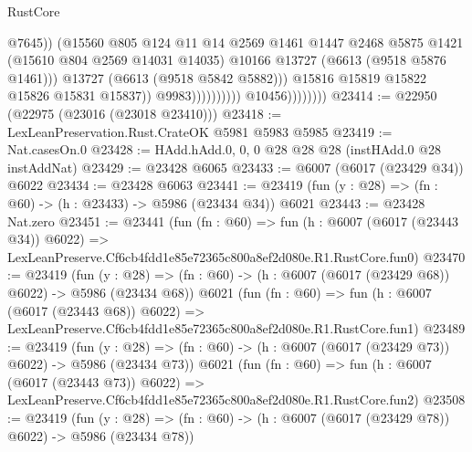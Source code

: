 \begin{lexlean}{RustCore}
\begin{coremodule}
                                                  @7645))
                                              (@15560
                                                @805
                                                @124
                                                @11
                                                @14
                                                @2569
                                                @1461
                                                @1447
                                                @2468
                                                @5875
                                                @1421
                                                (@15610 @804 @2569 @14031 @14035)
                                                @10166
                                                @13727
                                                (@6613 (@9518 @5876 @1461)))
                                              @13727
                                              (@6613 (@9518 @5842 @5882)))
                                            @15816
                                            @15819
                                            @15822
                                            @15826
                                            @15831
                                            @15837))
                                        @9983))))))))))
                    @10456))))))))
@23414 := @22950 (@22975 (@23016 (@23018 @23410)))
@23418 := LexLeanPreservation.Rust.CrateOK @5981 @5983 @5985
@23419 := Nat.casesOn.{0}
@23428 := HAdd.hAdd.{0, 0, 0} @28 @28 @28 (instHAdd.{0} @28 instAddNat)
@23429 := @23428 @6065
@23433 := @6007 (@6017 (@23429 @34)) @6022
@23434 := @23428 @6063
@23441 := @23419 (fun (y : @28) => (fn : @60) -> (h : @23433) -> @5986 (@23434 @34)) @6021
@23443 := @23428 Nat.zero
@23451 := @23441
    (fun (fn : @60) =>
    fun (h : @6007 (@6017 (@23443 @34)) @6022) =>
    LexLeanPreserve.Cf6cb4fdd1e85e72365c800a8ef2d080e.R1.RustCore.fun0)
@23470 := @23419
    (fun (y : @28) => (fn : @60) -> (h : @6007 (@6017 (@23429 @68)) @6022) -> @5986 (@23434 @68))
    @6021
    (fun (fn : @60) =>
    fun (h : @6007 (@6017 (@23443 @68)) @6022) =>
    LexLeanPreserve.Cf6cb4fdd1e85e72365c800a8ef2d080e.R1.RustCore.fun1)
@23489 := @23419
    (fun (y : @28) => (fn : @60) -> (h : @6007 (@6017 (@23429 @73)) @6022) -> @5986 (@23434 @73))
    @6021
    (fun (fn : @60) =>
    fun (h : @6007 (@6017 (@23443 @73)) @6022) =>
    LexLeanPreserve.Cf6cb4fdd1e85e72365c800a8ef2d080e.R1.RustCore.fun2)
@23508 := @23419
    (fun (y : @28) => (fn : @60) -> (h : @6007 (@6017 (@23429 @78)) @6022) -> @5986 (@23434 @78))

\end{coremodule}
\end{lexlean}
